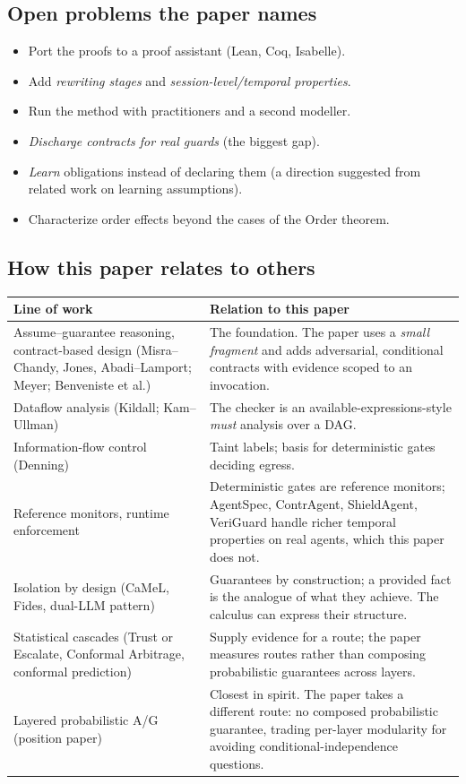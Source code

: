 \subsection{Open problems the paper names}

\begin{itemize}
\item Port the proofs to a proof assistant (Lean, Coq, Isabelle).
\item Add \emph{rewriting stages} and \emph{session-level/temporal properties}.
\item Run the method with practitioners and a second modeller.
\item \emph{Discharge contracts for real guards} (the biggest gap).
\item \emph{Learn} obligations instead of declaring them (a direction suggested from related work on learning assumptions).
\item Characterize order effects beyond the cases of the Order theorem.
\end{itemize}

\subsection{How this paper relates to others}

\begin{center}
\renewcommand{\arraystretch}{1.25}
\small
\begin{tabularx}{\textwidth}{@{}p{3.6cm}X@{}}
\toprule
\textbf{Line of work} & \textbf{Relation to this paper}\\
\midrule
Assume--guarantee reasoning, contract-based design (Misra--Chandy, Jones, Abadi--Lamport; Meyer; Benveniste et al.) & The foundation. The paper uses a \emph{small fragment} and adds adversarial, conditional contracts with evidence scoped to an invocation.\\
Dataflow analysis (Kildall; Kam--Ullman) & The checker is an available-expressions-style \emph{must} analysis over a DAG.\\
Information-flow control (Denning) & Taint labels; basis for deterministic gates deciding egress.\\
Reference monitors, runtime enforcement & Deterministic gates are reference monitors; AgentSpec, ContrAgent, ShieldAgent, VeriGuard handle richer temporal properties on real agents, which this paper does not.\\
Isolation by design (CaMeL, Fides, dual-LLM pattern) & Guarantees by construction; a provided fact is the analogue of what they achieve. The calculus can express their structure.\\
Statistical cascades (Trust or Escalate, Conformal Arbitrage, conformal prediction) & Supply evidence for a route; the paper measures routes rather than composing probabilistic guarantees across layers.\\
Layered probabilistic A/G (position paper) & Closest in spirit. The paper takes a different route: no composed probabilistic guarantee, trading per-layer modularity for avoiding conditional-independence questions.\\
\bottomrule
\end{tabularx}
\end{center}

